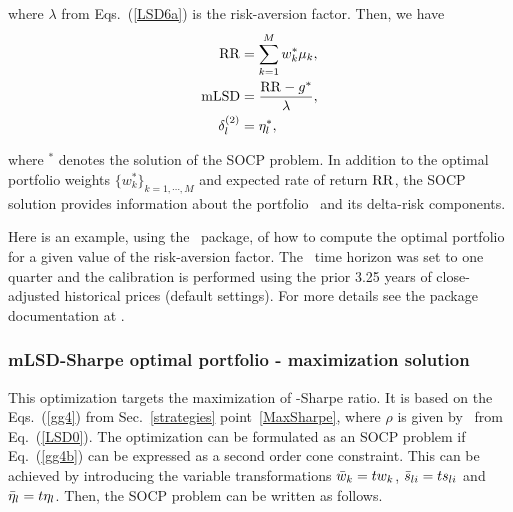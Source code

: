 \noindent where $\lambda$ from Eqs.~(\ref{LSD6a}) is the risk-aversion factor.
Then, we have
\begin{subequations}\label{LSD7}
\begin{align}
    \RR &= \sum_{k=1}^M w_k^* \mu_k, \label{LSD7a} \\
    \mLSD &= \frac{\RR - g^*}{\lambda}, \label{LSD7b} \\
    \delta^{(2)}_l &= \eta_l^*, \label{LSD7c}
\end{align}
\end{subequations}

\noindent where $^*$ denotes the solution of the SOCP problem.
In addition to the optimal portfolio weights $\{w_k^*\}_{k=1,\cdots,M}$ and expected rate of return ${\rm RR}$,
the SOCP solution provides information about the portfolio \mLSD\ and its delta-risk components.

\bigskip
\noindent Here is an example, using the \azapy\ package, of how to compute the optimal portfolio
for a given value of the risk-aversion factor.
The \mLSD\ time horizon was set to one quarter and the calibration is performed using the prior 3.25 years of
close-adjusted historical prices (default settings).
For more details see the package documentation at \azapydoc.



\BackToContents

\subsubsection{mLSD-Sharpe optimal portfolio - maximization solution}
This optimization targets the maximization of \mLSD-Sharpe ratio. It is based on the
Eqs.~(\ref{gg4}) from Sec.~\ref{strategies} point~\ref{MaxSharpe},
where $\rho$ is given by \mLSD\ from Eq.~(\ref{LSD0}).
The optimization can be formulated as an SOCP problem if Eq.~(\ref{gg4b}) can be expressed as a second order cone constraint.
This can be achieved by
introducing the variable transformations ${\bar w}_k = t w_k$, ${\bar s}_{li} = t s_{li}$ and ${\bar \eta}_l = t \eta_l$.
Then, the SOCP problem can be written as follows.

